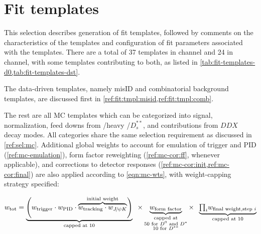 \section{Fit templates}
\label{ref:fit:tmpl}

This selection describes generation of fit templates, followed by comments on
the characteristics of the templates and configuration of fit parameters
associated with the templates.
There are a total of 37 templates in \Dz channel and 24 in \Dstar channel,
with some templates contributing to both, as listed in
\cref{tab:fit-templates-d0,tab:fit-templates-dst}.

The data-driven templates,
namely \muon misID and combinatorial background templates,
are discussed first in \cref{ref:fit:tmpl:misid,ref:fit:tmpl:comb}.

The rest are all MC templates which can be categorized into signal,
normalization, feed downs from \Dstst/heavy \Dstst/$D^{**}_s$, and contributions
from $DDX$ decay modes.
All categories share the same selection requirement as discussed in
\cref{ref:sel:mc}.
Additional global weights to account for emulation of trigger and PID
(\cref{ref:mc-emulation}),
form factor reweighting (\cref{ref:mc-cor:ff}, whenever applicable),
and corrections to detector responses (\cref{ref:mc-cor:init,ref:mc-cor:final})
are also applied according to \cref{eqn:mc-wts},
with weight-capping strategy specified:

\begin{equation}
    w_\text{tot} = \underbrace{\left(
            w_\text{trigger} \cdot w_\text{PID} \cdot
            \overbrace{
                w_\text{tracking} \cdot w_{\jpsi\kaon}
            }^\text{initial weight}
        \right)}_\text{capped at 10} \;\; \times
        \underbrace{w_\text{form factor}}_{\substack{
            \text{capped at} \\
            \text{50 for \Dz and \Dstar} \\
            \text{10 for $D^{**}$}
        }} \times \;\;
        \underbrace{
            {\textstyle\prod_i} w_\text{final weight,step $i$}
        }_\text{capped at 10}
        \label{eqn:mc-wts}
\end{equation}


